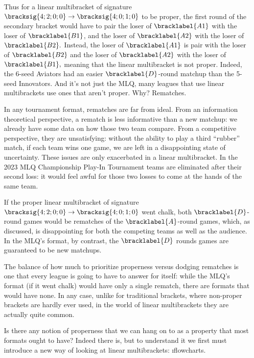 {    Thus for a linear multibracket of signature $\bracksig{4;2;0;0} \to \bracksig{4;0;1;0}$ to be proper, the first round of the secondary bracket would have to pair the loser of $\bracklabel{A1}$ with the loser of $\bracklabel{B1}$, and the loser of $\bracklabel{A2}$ with the loser of $\bracklabel{B2}.$ Instead, the loser of $\bracklabel{A1}$ is pair with the loser of $\bracklabel{B2}$ and the loser of $\bracklabel{A2}$ with the loser of $\bracklabel{B1},$ meaning that the linear multibracket is not proper. Indeed, the 6-seed Aviators had an easier $\bracklabel{D}$-round matchup than the 5-seed Innovators. And it's not just the MLQ, many leagues that use linear multibrackets use ones that aren't proper. Why? Rematches.

    In any tournament format, rematches are far from ideal. From an information theoretical perspective, a rematch is less informative than a new matchup: we already have some data on how those two team compare. From a competitive perspective, they are unsatisfying: without the ability to play a third ``rubber'' match, if each team wins one game, we are left in a disappointing state of uncertainty. These issues are only exacerbated in a linear multibracket. In the 2023 MLQ Championship Play-In Tournament teams are eliminated after their second loss: it would feel awful for those two losses to come at the hands of the same team.

    If the proper linear multibracket of signature $\bracksig{4;2;0;0} \to \bracksig{4;0;1;0}$ went chalk, both $\bracklabel{D}$-round games would be rematches of the $\bracklabel{A}$-round games, which, as discussed, is disappointing for both the competing teams as well as the audience. In the MLQ's format, by contrast, the $\bracklabel{D}$ rounds games are guaranteed to be new matchups.

    The balance of how much to prioritize properness versus dodging rematches is one that every league is going to have to answer for itself: while the MLQ's format (if it went chalk) would have only a single rematch, there are formats that would have none. In any case, unlike for traditional brackets, where non-proper brackets are hardly ever used, in the world of linear multibrackets they are actually quite common.

    Is there any notion of properness that we can hang on to as a property that most formats ought to have? Indeed there is, but to understand it we first must introduce a new way of looking at linear multibrackets: \i{flowcharts}.

}
